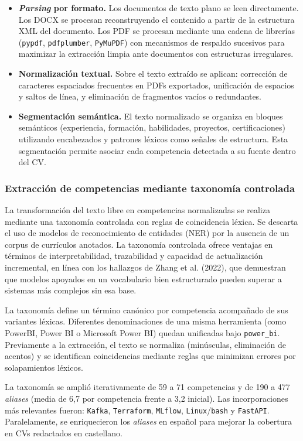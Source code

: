 \begin{itemize}
  \item \textbf{\textit{Parsing} por formato.} Los documentos de texto plano se leen directamente. Los DOCX se procesan reconstruyendo el contenido a partir de la estructura XML del documento. Los PDF se procesan mediante una cadena de librerías (\texttt{pypdf}, \texttt{pdfplumber}, \texttt{PyMuPDF}) con mecanismos de respaldo sucesivos para maximizar la extracción limpia ante documentos con estructuras irregulares.
  \item \textbf{Normalización textual.} Sobre el texto extraído se aplican: corrección de caracteres espaciados frecuentes en PDFs exportados, unificación de espacios y saltos de línea, y eliminación de fragmentos vacíos o redundantes.
  \item \textbf{Segmentación semántica.} El texto normalizado se organiza en bloques semánticos (experiencia, formación, habilidades, proyectos, certificaciones) utilizando encabezados y patrones léxicos como señales de estructura. Esta segmentación permite asociar cada competencia detectada a su fuente dentro del CV.
\end{itemize}

\subsubsection{Extracción de competencias mediante taxonomía controlada}
\label{subsubsec:extraccion_competencias}
La transformación del texto libre en competencias normalizadas se realiza mediante una taxonomía controlada con reglas de coincidencia léxica. Se descarta el uso de modelos de reconocimiento de entidades (NER) por la ausencia de un corpus de currículos anotados. La taxonomía controlada ofrece ventajas en términos de interpretabilidad, trazabilidad y capacidad de actualización incremental, en línea con los hallazgos de Zhang et al. (2022), que demuestran que modelos apoyados en un vocabulario bien estructurado pueden superar a sistemas más complejos sin esa base.

La taxonomía define un término canónico por competencia acompañado de sus variantes léxicas. Diferentes denominaciones de una misma herramienta (como PowerBI, Power BI o Microsoft Power BI) quedan unificadas bajo \texttt{power\_bi}. Previamente a la extracción, el texto se normaliza (minúsculas, eliminación de acentos) y se identifican coincidencias mediante reglas que minimizan errores por solapamientos léxicos.

La taxonomía se amplió iterativamente de 59 a 71 competencias y de 190 a 477 \textit{aliases} (media de 6,7 por competencia frente a 3,2 inicial). Las incorporaciones más relevantes fueron: \texttt{Kafka}, \texttt{Terraform}, \texttt{MLflow}, \texttt{Linux}/\texttt{bash} y \texttt{FastAPI}. Paralelamente, se enriquecieron los \textit{aliases} en español para mejorar la cobertura en CVs redactados en castellano.

